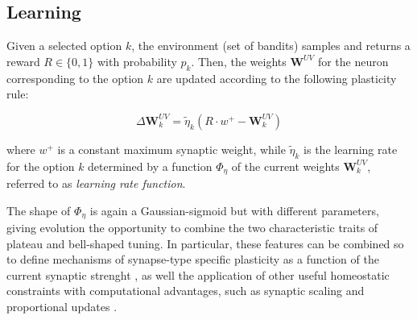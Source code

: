 

\subsection{Learning}
Given a selected option $k$, the environment (set of bandits) samples and returns a reward $R\in \{0, 1\}$ with probability $p_{k}$.
Then, the weights $\textbf{W}^{UV}$ for the neuron corresponding to the option $k$ are updated according to the following plasticity rule:

\begin{equation}
    \Delta \textbf{W}^{UV}_{k} = \tilde{\eta}_{k} \left(R\cdot w^{+}- \textbf{W}^{UV}_{k}\right)
\end{equation}

\noindent where $w^{+}$ is a constant maximum synaptic weight, while $\tilde{\eta}_{k}$ is the learning rate for the option $k$ determined by a function $\Phi_{\eta}$ of the current weights $\textbf{W}^{UV}_{k}$, referred to as \textit{learning rate function}.

The shape of $\Phi_{\eta}$ is again a Gaussian-sigmoid but with different parameters, giving evolution the opportunity to combine the two characteristic traits of plateau and bell-shaped tuning.
In particular, these features can be combined so to define mechanisms of synapse-type specific plasticity as a function of the current synaptic strenght \cite{larsenSynapsetypespecificPlasticityLocal2015}, as well the application of other useful homeostatic constraints with computational advantages, such as synaptic scaling and proportional updates \cite{citriSynapticPlasticityMultiple2008, kennedySynapticSignalingLearning2016, samavatSynapticInformationStorage2024}.


